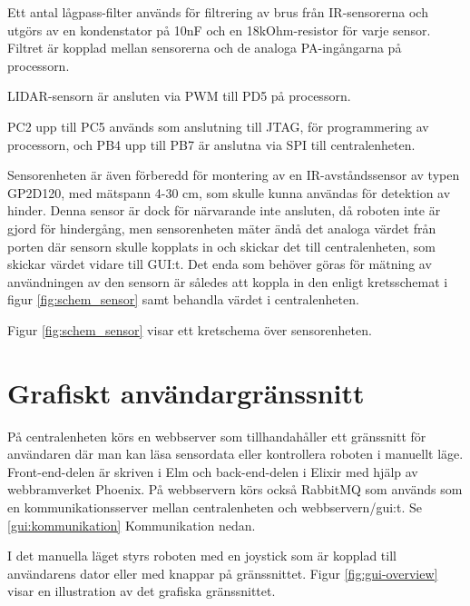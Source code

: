 \documentclass[a4paper,titlepage,12pt]{article}
\begin{document}
    Ett antal lågpass-filter används för filtrering av brus från IR-sensorerna
    och utgörs av en kondenstator på 10nF och en 18kOhm-resistor för varje
    sensor. Filtret är kopplad mellan sensorerna och de analoga PA-ingångarna på
    processorn.

    LIDAR-sensorn är ansluten via PWM till PD5 på processorn.

    PC2 upp till PC5 används som anslutning till JTAG, för programmering av
    processorn, och PB4 upp till PB7 är anslutna via SPI till centralenheten.

    Sensorenheten är även förberedd för montering av en IR-avståndssensor av
    typen GP2D120, med mätspann 4-30 cm, som skulle kunna användas för
    detektion av hinder. Denna sensor är dock för närvarande inte ansluten, då
    roboten inte är gjord för hindergång, men sensorenheten mäter ändå
    det analoga värdet från porten där sensorn skulle kopplats in och skickar
    det till centralenheten, som skickar värdet vidare till GUI:t.
    Det enda som behöver göras för mätning av
    användningen av den sensorn är således att koppla in den enligt
    kretsschemat i figur \ref{fig:schem_sensor} samt behandla värdet i
    centralenheten.

    Figur \ref{fig:schem_sensor} visar ett kretschema över sensorenheten.

	

    \newpage
	\section{Grafiskt användargränssnitt}
	På centralenheten körs en webbserver som tillhandahåller ett gränssnitt för
    användaren där man kan läsa sensordata eller kontrollera roboten i manuellt
    läge. Front-end-delen är skriven i Elm och back-end-delen i Elixir med hjälp
    av webbramverket Phoenix. På webbservern körs också RabbitMQ som används som
    en kommunikationsserver mellan centralenheten och webbservern/gui:t. Se
    \ref{gui:kommunikation} Kommunikation nedan.

	I det manuella läget styrs roboten med en joystick som är kopplad till
    användarens dator eller med knappar på gränssnittet. Figur
    \ref{fig:gui-overview} visar en illustration av det grafiska gränssnittet.
	
\end{document}
